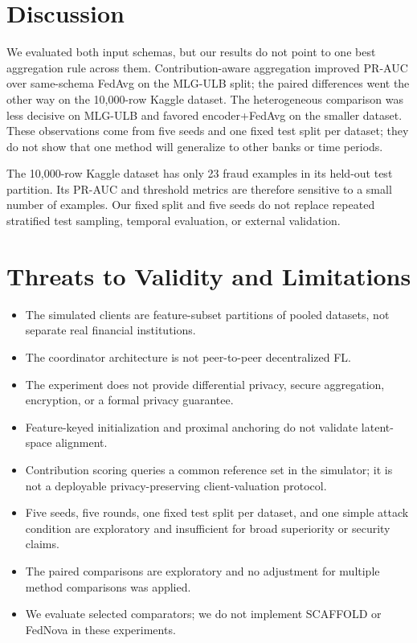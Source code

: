\documentclass{ieeeaccess}
\begin{document}
\section{Discussion}
We evaluated both input schemas, but our results do not point to one best
aggregation rule across them. Contribution-aware aggregation improved PR-AUC
over same-schema FedAvg on the MLG-ULB split; the paired differences went the
other way on the 10,000-row Kaggle dataset. The heterogeneous comparison was
less decisive on MLG-ULB and favored encoder+FedAvg on the smaller dataset.
These observations come from five seeds and one fixed test split per dataset;
they do not show that one method will generalize to other banks or time
periods.

The 10,000-row Kaggle dataset has only 23 fraud examples in its held-out test
partition. Its PR-AUC and threshold metrics are therefore sensitive to a small
number of examples. Our fixed split and five seeds do not replace repeated
stratified test sampling, temporal evaluation, or external validation.

\section{Threats to Validity and Limitations}
\begin{itemize}
  \item The simulated clients are feature-subset partitions of pooled
  datasets, not separate real financial institutions.
  \item The coordinator architecture is not peer-to-peer decentralized FL.
  \item The experiment does not provide differential privacy, secure
  aggregation, encryption, or a formal privacy guarantee.
  \item Feature-keyed initialization and proximal anchoring do not validate
  latent-space alignment.
  \item Contribution scoring queries a common reference set in the simulator;
  it is not a deployable privacy-preserving client-valuation protocol.
  \item Five seeds, five rounds, one fixed test split per dataset, and one
  simple attack condition are exploratory and insufficient for broad
  superiority or security claims.
  \item The paired comparisons are exploratory and no adjustment for multiple
  method comparisons was applied.
  \item We evaluate selected comparators; we do not implement SCAFFOLD or
  FedNova in these experiments.
\end{itemize}
\end{document}
